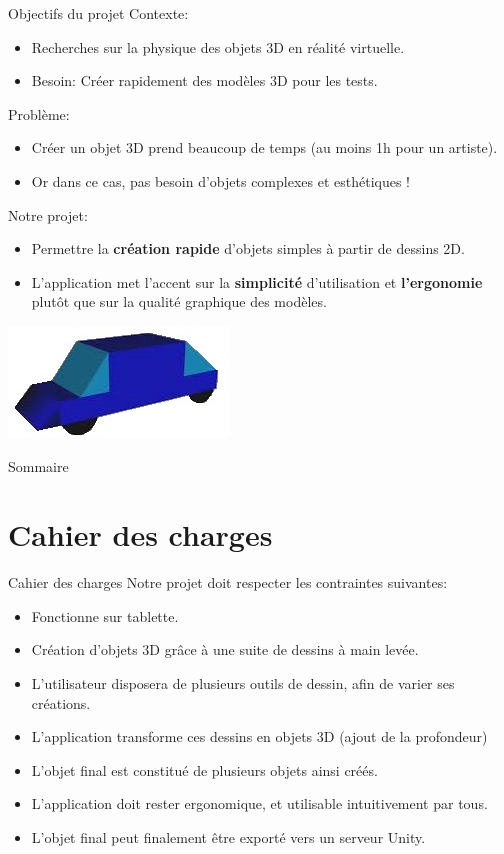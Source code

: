 \documentclass[a4paper,10pt]{beamer}
\begin{document}
	\begin{frame}{Objectifs du projet}
		Contexte:
		\begin{itemize}
			\item Recherches sur la physique des objets 3D en réalité virtuelle.
			\item Besoin: Créer rapidement des modèles 3D pour les tests.
		\end{itemize}
		Problème:
			\begin{itemize}
				\item Créer un objet 3D prend beaucoup de temps (au moins 1h pour un artiste).
				\item Or dans ce cas, pas besoin d'objets complexes et esthétiques !
			\end{itemize}
		Notre projet:
		\begin{itemize}
		\item Permettre la \textbf{création rapide} d'objets simples à partir de dessins 2D.
		\item L'application met l'accent sur la \textbf{simplicité} d'utilisation et \textbf{l'ergonomie} plutôt que sur la qualité graphique des modèles.
		\end{itemize}
			\centerline{\includegraphics[scale=0.3]{images/intro/car.jpg}}
	\end{frame}
	
	\begin{frame}{Sommaire}
		\tableofcontents
	\end{frame}
	
	\section{Cahier des charges}
	
	\begin{frame}{Cahier des charges}
		Notre projet doit respecter les contraintes suivantes:
		\begin{itemize}
			\item Fonctionne sur tablette.
			\item Création d'objets 3D grâce à une suite de dessins à main levée.
			\item L'utilisateur disposera de plusieurs outils de dessin, afin de varier ses créations.
			\item L'application transforme ces dessins en objets 3D (ajout de la profondeur)
			\item L'objet final est constitué de plusieurs objets ainsi créés.
			\item L'application doit rester ergonomique, et utilisable intuitivement par tous.
			\item L'objet final peut finalement être exporté vers un serveur Unity.
		\end{itemize}
	\end{frame}
	
\end{document}

